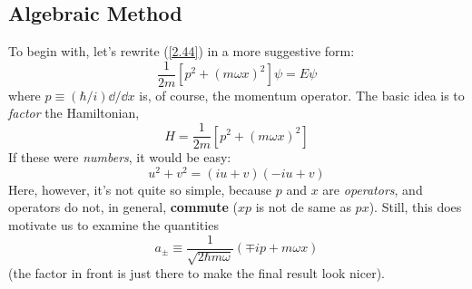 \subsection{Algebraic Method}
To begin with, let's rewrite (\ref{2.44}) in a more suggestive form:
\begin{equation}\label{2.45}
	\frac{1}{2m}[p^2+(m\omega x)^2]\psi=E\psi
\end{equation}
where $p\equiv (\hbar/i)\dd /\dd x$ is, of course, the momentum operator. The basic idea is to \textit{factor} the Hamiltonian,
\begin{equation}\label{2.46}
	H=\frac{1}{2m}[p^2+(m\omega x)^2]
\end{equation}
If these were \textit{numbers}, it would be easy: $$u^2+v^2=(iu+v)(-iu+v)$$
Here, however, it's not quite so simple, because $p$ and $x$ are \textit{operators},  and operators do not, in general, \textbf{commute} ($xp$ is not de same as $px$). Still, this does motivate us to examine the quantities
\begin{equation}\label{2.47}
	\boxed{a_{\pm}\equiv\frac{1}{\sqrt{2\hbar m\omega}}(\mp ip+m\omega x)}
\end{equation}
(the factor in front is just there to make the final result look nicer).

